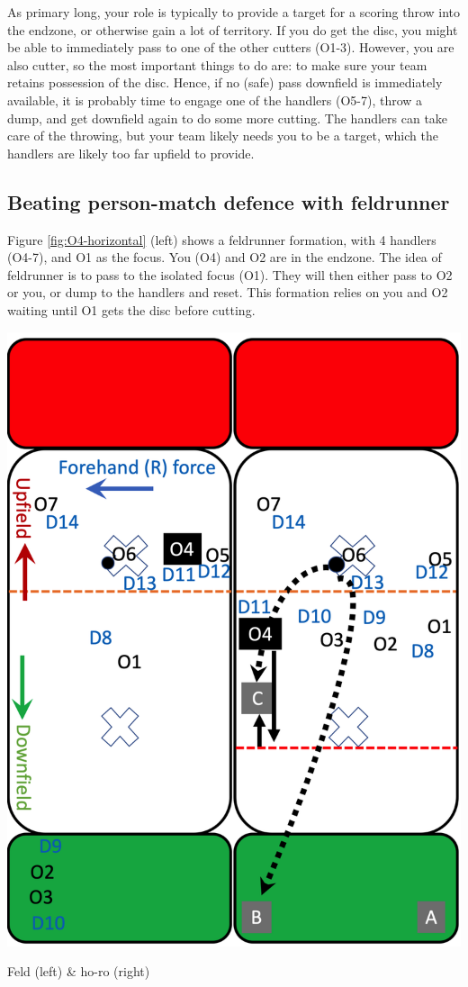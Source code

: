 \documentclass{tufte-handout}
\begin{document}
As primary long, 
your role is 
typically to provide 
a target for a scoring throw 
into the endzone, or 
otherwise gain a lot of 
territory. If you do get the disc,
you might be able to immediately
pass to one of the other cutters 
(O1-3). 
However, 
you are also cutter, 
so the most 
important things to do are:
to make sure your team 
retains possession of the disc.
Hence, 
if no (safe) pass downfield 
is immediately available, 
it is probably time to engage 
one of the handlers (O5-7), 
throw a dump, 
and get downfield again 
to do some more cutting.  
The handlers can take care
of the throwing, 
but your team likely 
needs you to be a target, 
which the handlers are likely 
too far upfield to provide.


\subsection{Beating person-match defence with feldrunner}
\label{sec:feld}
Figure \ref{fig:O4-horizontal} (left) 
shows a feldrunner formation, 
with 4 handlers (O4-7), 
and O1 as the focus.
You  
(O4) 
and O2
are in the endzone. The idea of feldrunner 
is to pass to 
the isolated
focus (O1). 
They will then either pass to 
O2 or you, 
or dump to the handlers
and reset. This formation relies 
on you and O2 
waiting until O1 
gets the disc 
before cutting.  
\begin{marginfigure}%
  \includegraphics[width=\linewidth]{O4-horizontal}
  \caption{Feld (left) \& ho-ro (right)}
  \label{fig:O4-horizontal}
\end{marginfigure}
\end{document}
